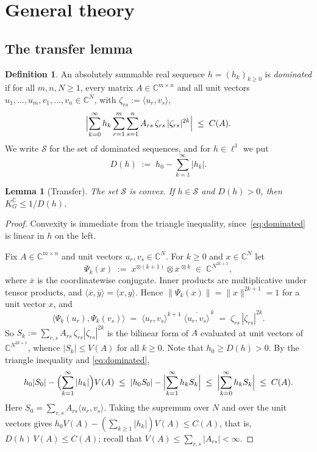 \documentclass[11pt,reqno]{amsart}
\newtheorem{lemma}[theorem]{Lemma}
\theoremstyle{definition}
\newtheorem{definition}[theorem]{Definition}
\numberwithin{equation}{section}
\newcommand{\C}{\mathbb{C}}
\newcommand{\KGC}{K_G^{\C}}
\newcommand{\Scl}{\mathcal{S}}
\begin{document}
\section{General theory}\label{sec:theory}

\subsection{The transfer lemma}
\begin{definition}\label{def:dominated}
An absolutely summable real sequence $h = (h_k)_{k \ge 0}$ is \emph{dominated} if for all $m,n,N\ge1$, every matrix $A \in \C^{m \times n}$ and all unit vectors $u_1,\dots,u_m, v_1,\dots,v_n \in \C^N$, with $\zeta_{rs}:=\langle u_r,v_s\rangle$,
\begin{equation}\label{eq:dominated}
  \Bigl| \sum_{k=0}^\infty h_k \sum_{r=1}^m \sum_{s=1}^n A_{rs}\, \zeta_{rs}\, |\zeta_{rs}|^{2k} \Bigr|
  \;\le\; C(A).
\end{equation}
We write $\Scl$ for the set of dominated sequences, and for $h\in\ell^1$ we put
\[
  D(h) \;:=\; h_0 - \sum_{k=1}^\infty |h_k| .
\]
\end{definition}

\begin{lemma}[Transfer]\label{lem:transfer}
The set $\Scl$ is convex. If $h\in\Scl$ and $D(h) > 0$, then $\KGC \le 1 / D(h)$.
\end{lemma}

\begin{proof}
Convexity is immediate from the triangle inequality, since~\eqref{eq:dominated} is linear in $h$ on the left.

Fix $A \in \C^{m \times n}$ and unit vectors $u_r, v_s \in \C^N$. For $k \ge 0$ and $x \in \C^N$ let
\[
  \Psi_k(x) \;:=\; x^{\otimes (k+1)} \otimes \overline{x}^{\,\otimes k} \;\in\; \C^{N^{2k+1}},
\]
where $\overline{x}$ is the coordinatewise conjugate. Inner products are multiplicative under tensor products, and $\langle\overline{x},\overline{y}\rangle=\overline{\langle x,y\rangle}$. Hence $\|\Psi_k(x)\| = \|x\|^{2k+1}=1$ for a unit vector $x$, and
\begin{equation}\label{eq:tensor-power}
  \langle \Psi_k(u_r), \Psi_k(v_s) \rangle
  \;=\; \langle u_r, v_s \rangle^{k+1}\; \overline{\langle u_r, v_s \rangle}^{\,k}
  \;=\; \zeta_{rs}\,|\zeta_{rs}|^{2k}.
\end{equation}
So $S_k := \sum_{r,s} A_{rs}\, \zeta_{rs} |\zeta_{rs}|^{2k}$ is the bilinear form of $A$ evaluated at unit vectors of $\C^{N^{2k+1}}$, whence $|S_k| \le V(A)$ for all $k \ge 0$. Note that $h_0\ge D(h)>0$. By the triangle inequality and \eqref{eq:dominated},
\[
  h_0 |S_0| - \Bigl(\sum_{k=1}^\infty |h_k|\Bigr) V(A)
  \;\le\; |h_0 S_0| - \Bigl|\sum_{k=1}^\infty h_k S_k\Bigr|
  \;\le\; \Bigl|\sum_{k=0}^\infty h_k S_k\Bigr|
  \;\le\; C(A).
\]
Here $S_0=\sum_{r,s}A_{rs}\langle u_r,v_s\rangle$. Taking the supremum over $N$ and over the unit vectors gives $h_0V(A)-(\sum_{k\ge1}|h_k|)V(A)\le C(A)$, that is, $D(h)\, V(A) \le C(A)$; recall that $V(A)\le\sum_{r,s}|A_{rs}|<\infty$.
\end{proof}
\end{document}
